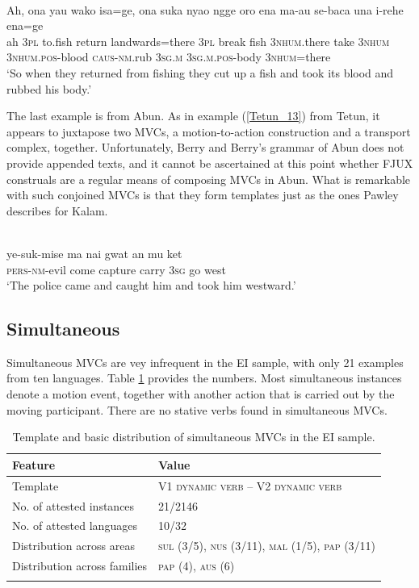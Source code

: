 \ea \label{Tidore_87}
\\
\gll Ah, ona yau wako isa=ge, ona suka nyao ngge oro ena ma-au se-baca una i-rehe ena=ge \\
ah 3\textsc{pl} to.fish return landwards=there 3\textsc{pl} break fish 3\textsc{nhum}.there take 3\textsc{nhum} 3\textsc{nhum}.\textsc{pos}-blood \textsc{caus}-\textsc{nm}.rub 3\textsc{sg}.\textsc{m} 3\textsc{sg}.\textsc{m}.\textsc{pos}-body 3\textsc{nhum}=there \\
\glft ‘So when they returned from fishing they cut up a fish and took its blood and rubbed his body.’\\ 
\z

The last example is from Abun. As in example (\ref{Tetun_13}) from Tetun, it appears to juxtapose two MVCs, a motion-to-action construction and a transport complex, together. Unfortunately, Berry and Berry's grammar of Abun does not provide appended texts, and it cannot be ascertained at this point whether FJUX construals are a regular means of composing MVCs in Abun. What is remarkable with such conjoined MVCs is that they form templates just as the ones Pawley describes for Kalam.

\ea \label{Abun_4}
\\
\gll ye-suk-mise ma nai gwat an mu ket \\
\textsc{pers}-\textsc{nm}-evil come capture carry 3\textsc{sg} go west \\
\glft `The police came and caught him and took him westward.'\\ 
\z

\subsection{Simultaneous} \label{sec:simultaneous}

Simultaneous \textsc{MVC}s are vey infrequent in the EI sample, with only 21 examples from ten languages. Table \ref{table:simultaneous} provides the numbers. Most simultaneous instances denote a motion event, together with another action that is carried out by the moving participant. There are no stative verbs found in simultaneous MVCs.

\begin{table}
\begin{tabular}{ll}
\lsptoprule
Feature&Value\tabularnewline
\midrule
Template& V1 \textsc{dynamic verb} -- V2 \textsc{dynamic verb}\tabularnewline
No. of attested instances& 21/2146 \tabularnewline
No. of attested languages& 10/32 \tabularnewline
Distribution across areas& \textsc{sul} (3/5), \textsc{nus} (3/11), \textsc{mal} (1/5), \textsc{pap} (3/11) \tabularnewline
Distribution across families& \textsc{pap} (4), \textsc{aus} (6) \tabularnewline
\lspbottomrule
\end{tabular}
\caption[Template and basic distribution of simultaneous MVCs]{Template and basic distribution of simultaneous MVCs in the EI sample.}
\label{table:simultaneous}
\end{table}


